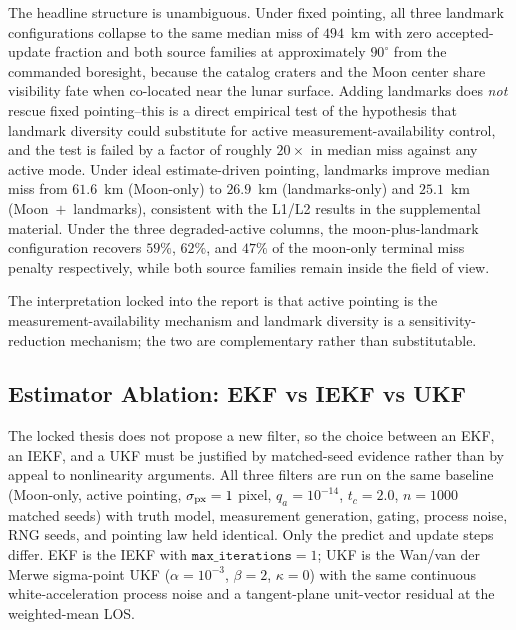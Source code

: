 \documentclass[10pt,twocolumn]{article}
\begin{document}
The headline structure is unambiguous.  Under fixed pointing, all three landmark configurations collapse to the same median miss of $494$~km with zero accepted-update fraction and both source families at approximately $90^{\circ}$ from the commanded boresight, because the catalog craters and the Moon center share visibility fate when co-located near the lunar surface.  Adding landmarks does \emph{not} rescue fixed pointing--this is a direct empirical test of the hypothesis that landmark diversity could substitute for active measurement-availability control, and the test is failed by a factor of roughly $20\times$ in median miss against any active mode.  Under ideal estimate-driven pointing, landmarks improve median miss from $61.6$~km (Moon-only) to $26.9$~km (landmarks-only) and $25.1$~km (Moon~$+$~landmarks), consistent with the L1/L2 results in the supplemental material.  Under the three degraded-active columns, the moon-plus-landmark configuration recovers $59\%$, $62\%$, and $47\%$ of the moon-only terminal miss penalty respectively, while both source families remain inside the field of view.

The interpretation locked into the report is that active pointing is the measurement-availability mechanism and landmark diversity is a sensitivity-reduction mechanism; the two are complementary rather than substitutable.

\subsection{Estimator Ablation: EKF vs IEKF vs UKF}
\label{sec:results-ablation}
The locked thesis does not propose a new filter, so the choice between an EKF, an IEKF, and a UKF must be justified by matched-seed evidence rather than by appeal to nonlinearity arguments.  All three filters are run on the same baseline (Moon-only, active pointing, $\sigma_{\rm px}=1$ pixel, $q_a=10^{-14}$, $t_c=2.0$, $n=1000$ matched seeds) with truth model, measurement generation, gating, process noise, RNG seeds, and pointing law held identical.  Only the predict and update steps differ.  EKF is the IEKF with $\texttt{max\_iterations}=1$; UKF is the Wan/van der Merwe sigma-point UKF ($\alpha=10^{-3}$, $\beta=2$, $\kappa=0$) with the same continuous white-acceleration process noise and a tangent-plane unit-vector residual at the weighted-mean LOS.
\end{document}

